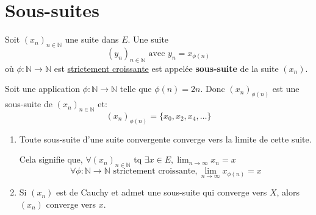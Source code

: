 \documentclass[a4paper]{report}
\newcommand\N{\ensuremath{\mathbb{N}}}
\theoremstyle{definition}
\begin{document}
\section{Sous-suites}
\begin{definition}
    Soit $(x_n)_{n \in \N}$ une suite dans $E$. Une suite  
    \[
        (y_n)_{n \in \N} \text{ avec } y_n = x_{\phi(n)}
    \] 
    où $\phi: \N \to \N$ est \underline{strictement croissante} est appelée \textbf{sous-suite} de la suite $(x_n)$.
\end{definition}
\begin{eg}
    Soit une application $\phi: \N \to \N$ telle que $\phi(n) = 2n$. Donc  $(x_n)_{\phi(n)}$ est une sous-suite de  $(x_n)_{n \in \N}$ et:
    \[
        (x_n)_{\phi(n)} = \{x_0, x_2, x_4, \ldots\}
    \] 
\end{eg}
\begin{prop}
   \begin{enumerate}
       \item Toute sous-suite d'une suite convergente converge vers la limite de cette suite.
           \par
           Cela signifie que, $\forall (x_n)_{n \in \N}$ tq $\exists x \in E, \lim_{n \to \infty} x_n = x$
           \[
               \forall \phi: \N \to \N \text{ strictement croissante}, \lim_{n \to \infty} x_{\phi(n)} = x
           \] 
        \item Si $(x_n)$ est de Cauchy et admet une sous-suite qui converge vers  $X$, alors  $(x_n)$ converge vers  $x$.
   \end{enumerate} 
\end{prop}
\end{document}
